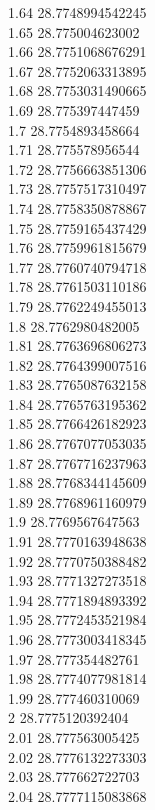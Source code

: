 {1.64	28.7748994542245\\
1.65	28.775004623002\\
1.66	28.7751068676291\\
1.67	28.7752063313895\\
1.68	28.7753031490665\\
1.69	28.775397447459\\
1.7	28.7754893458664\\
1.71	28.775578956544\\
1.72	28.7756663851306\\
1.73	28.7757517310497\\
1.74	28.7758350878867\\
1.75	28.7759165437429\\
1.76	28.7759961815679\\
1.77	28.7760740794718\\
1.78	28.7761503110186\\
1.79	28.7762249455013\\
1.8	28.7762980482005\\
1.81	28.7763696806273\\
1.82	28.7764399007516\\
1.83	28.7765087632158\\
1.84	28.7765763195362\\
1.85	28.7766426182923\\
1.86	28.7767077053035\\
1.87	28.7767716237963\\
1.88	28.7768344145609\\
1.89	28.7768961160979\\
1.9	28.7769567647563\\
1.91	28.7770163948638\\
1.92	28.7770750388482\\
1.93	28.7771327273518\\
1.94	28.7771894893392\\
1.95	28.7772453521984\\
1.96	28.7773003418345\\
1.97	28.777354482761\\
1.98	28.7774077981814\\
1.99	28.777460310069\\
2	28.7775120392404\\
2.01	28.777563005425\\
2.02	28.7776132273303\\
2.03	28.777662722703\\
2.04	28.7777115083868\\
}
